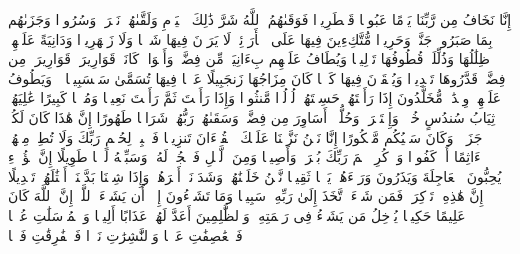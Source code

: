 \startbuffer[\q:76:10]
إِنَّا نَخَافُ مِن رَّبِّنَا یَوۡمًا عَبُوسࣰا قَمۡطَرِیرࣰا%
\stopbuffer
\startbuffer[\q:76:11]
فَوَقَىٰهُمُ ٱللَّهُ شَرَّ ذَٰلِكَ ٱلۡیَوۡمِ وَلَقَّىٰهُمۡ نَضۡرَةࣰ وَسُرُورࣰا%
\stopbuffer
\startbuffer[\q:76:12]
وَجَزَىٰهُم بِمَا صَبَرُوا۟ جَنَّةࣰ وَحَرِیرࣰا%
\stopbuffer
\startbuffer[\q:76:13]
مُّتَّكِءِینَ فِیهَا عَلَى ٱلۡأَرَاۤئِكِۖ لَا یَرَوۡنَ فِیهَا شَمۡسࣰا وَلَا زَمۡهَرِیرࣰا%
\stopbuffer
\startbuffer[\q:76:14]
وَدَانِیَةً عَلَیۡهِمۡ ظِلَٰلُهَا وَذُلِّلَتۡ قُطُوفُهَا تَذۡلِیلࣰا%
\stopbuffer
\startbuffer[\q:76:15]
وَیُطَافُ عَلَیۡهِم بِءَانِیَةࣲ مِّن فِضَّةࣲ وَأَكۡوَابࣲ كَانَتۡ قَوَارِیرَا۠%
\stopbuffer
\startbuffer[\q:76:16]
قَوَارِیرَا۟ مِن فِضَّةࣲ قَدَّرُوهَا تَقۡدِیرࣰا%
\stopbuffer
\startbuffer[\q:76:17]
وَیُسۡقَوۡنَ فِیهَا كَأۡسࣰا كَانَ مِزَاجُهَا زَنجَبِیلًا%
\stopbuffer
\startbuffer[\q:76:18]
عَیۡنࣰا فِیهَا تُسَمَّىٰ سَلۡسَبِیلࣰا%
\stopbuffer
\startbuffer[\q:76:19]
۞ وَیَطُوفُ عَلَیۡهِمۡ وِلۡدَٰنࣱ مُّخَلَّدُونَ إِذَا رَأَیۡتَهُمۡ حَسِبۡتَهُمۡ لُؤۡلُؤࣰا مَّنثُورࣰا%
\stopbuffer
\startbuffer[\q:76:20]
وَإِذَا رَأَیۡتَ ثَمَّ رَأَیۡتَ نَعِیمࣰا وَمُلۡكࣰا كَبِیرًا%
\stopbuffer
\startbuffer[\q:76:21]
عَٰلِیَهُمۡ ثِیَابُ سُندُسٍ خُضۡرࣱ وَإِسۡتَبۡرَقࣱۖ وَحُلُّوۤا۟ أَسَاوِرَ مِن فِضَّةࣲ وَسَقَىٰهُمۡ رَبُّهُمۡ شَرَابࣰا طَهُورًا%
\stopbuffer
\startbuffer[\q:76:22]
إِنَّ هَٰذَا كَانَ لَكُمۡ جَزَاۤءࣰ وَكَانَ سَعۡیُكُم مَّشۡكُورًا%
\stopbuffer
\startbuffer[\q:76:23]
إِنَّا نَحۡنُ نَزَّلۡنَا عَلَیۡكَ ٱلۡقُرۡءَانَ تَنزِیلࣰا%
\stopbuffer
\startbuffer[\q:76:24]
فَٱصۡبِرۡ لِحُكۡمِ رَبِّكَ وَلَا تُطِعۡ مِنۡهُمۡ ءَاثِمًا أَوۡ كَفُورࣰا%
\stopbuffer
\startbuffer[\q:76:25]
وَٱذۡكُرِ ٱسۡمَ رَبِّكَ بُكۡرَةࣰ وَأَصِیلࣰا%
\stopbuffer
\startbuffer[\q:76:26]
وَمِنَ ٱلَّیۡلِ فَٱسۡجُدۡ لَهُۥ وَسَبِّحۡهُ لَیۡلࣰا طَوِیلًا%
\stopbuffer
\startbuffer[\q:76:27]
إِنَّ هَٰۤؤُلَاۤءِ یُحِبُّونَ ٱلۡعَاجِلَةَ وَیَذَرُونَ وَرَاۤءَهُمۡ یَوۡمࣰا ثَقِیلࣰا%
\stopbuffer
\startbuffer[\q:76:28]
نَّحۡنُ خَلَقۡنَٰهُمۡ وَشَدَدۡنَاۤ أَسۡرَهُمۡۖ وَإِذَا شِئۡنَا بَدَّلۡنَاۤ أَمۡثَٰلَهُمۡ تَبۡدِیلًا%
\stopbuffer
\startbuffer[\q:76:29]
إِنَّ هَٰذِهِۦ تَذۡكِرَةࣱۖ فَمَن شَاۤءَ ٱتَّخَذَ إِلَىٰ رَبِّهِۦ سَبِیلࣰا%
\stopbuffer
\startbuffer[\q:76:30]
وَمَا تَشَاۤءُونَ إِلَّاۤ أَن یَشَاۤءَ ٱللَّهُۚ إِنَّ ٱللَّهَ كَانَ عَلِیمًا حَكِیمࣰا%
\stopbuffer
\startbuffer[\q:76:31]
یُدۡخِلُ مَن یَشَاۤءُ فِی رَحۡمَتِهِۦۚ وَٱلظَّٰلِمِینَ أَعَدَّ لَهُمۡ عَذَابًا أَلِیمَۢا%
\stopbuffer
\startbuffer[\q:77:1]
وَٱلۡمُرۡسَلَٰتِ عُرۡفࣰا%
\stopbuffer
\startbuffer[\q:77:2]
فَٱلۡعَٰصِفَٰتِ عَصۡفࣰا%
\stopbuffer
\startbuffer[\q:77:3]
وَٱلنَّٰشِرَٰتِ نَشۡرࣰا%
\stopbuffer
\startbuffer[\q:77:4]
فَٱلۡفَٰرِقَٰتِ فَرۡقࣰا%
\stopbuffer

